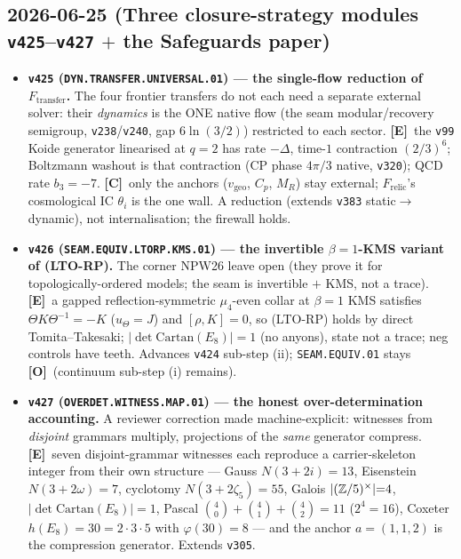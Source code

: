 \documentclass[11pt]{article}
\providecommand{\mE}{\textbf{[E]}}\providecommand{\mC}{\textbf{[C]}}
\providecommand{\mO}{\textbf{[O]}}\providecommand{\mX}{\textbf{[X]}}
\begin{document}
\subsection*{2026-06-25 (Three closure-strategy modules \texttt{v425}--\texttt{v427} $+$ the Safeguards paper)}
\begin{itemize}
\item \textbf{\texttt{v425} (\texttt{DYN.TRANSFER.UNIVERSAL.01}) --- the single-flow reduction of
$F_{\mathrm{transfer}}$.} The four frontier transfers do not each need a separate external solver: their
\emph{dynamics} is the ONE native flow (the seam modular/recovery semigroup, \texttt{v238}/\texttt{v240},
gap $6\ln(3/2)$) restricted to each sector. \mE\ the \texttt{v99} Koide generator linearised at $q{=}2$ has
rate $-\Delta$, time-$1$ contraction $(2/3)^6$; Boltzmann washout is that contraction (CP phase $4\pi/3$
native, \texttt{v320}); QCD rate $b_3{=}-7$. \mC\ only the anchors ($v_{\mathrm{geo}}$, $C_p$, $M_R$) stay
external; $F_{\mathrm{relic}}$'s cosmological IC $\theta_i$ is the one wall. A reduction (extends
\texttt{v383} static$\to$dynamic), not internalisation; the firewall holds.
\item \textbf{\texttt{v426} (\texttt{SEAM.EQUIV.LTORP.KMS.01}) --- the invertible $\beta{=}1$-KMS variant of
(LTO-RP).} The corner NPW26 leave open (they prove it for topologically-ordered models; the seam is
invertible $+$ KMS, not a trace). \mE\ a gapped reflection-symmetric $\mu_4$-even collar at $\beta{=}1$ KMS
satisfies $\Theta K\Theta^{-1}{=}{-}K$ ($u_\Theta{=}J$) and $[\rho,K]{=}0$, so (LTO-RP) holds by direct
Tomita--Takesaki; $|\!\det\mathrm{Cartan}(E_8)|{=}1$ (no anyons), state not a trace; neg controls have
teeth. Advances \texttt{v424} sub-step (ii); \texttt{SEAM.EQUIV.01} stays \mO\ (continuum sub-step (i)
remains).
\item \textbf{\texttt{v427} (\texttt{OVERDET.WITNESS.MAP.01}) --- the honest over-determination accounting.}
A reviewer correction made machine-explicit: witnesses from \emph{disjoint} grammars multiply, projections
of the \emph{same} generator compress. \mE\ seven disjoint-grammar witnesses each reproduce a
carrier-skeleton integer from their own structure --- Gauss $N(3{+}2i){=}13$, Eisenstein $N(3{+}2\omega){=}7$,
cyclotomy $N(3{+}2\zeta_5){=}55$, Galois $|(\mathbb{Z}/5)^\times|{=}4$, $|\!\det\mathrm{Cartan}(E_8)|{=}1$, Pascal
$\binom40{+}\binom41{+}\binom42{=}11$ ($2^4{=}16$), Coxeter $h(E_8){=}30{=}2{\cdot}3{\cdot}5$ with
$\varphi(30){=}8$ --- and the anchor $a{=}(1,1,2)$ is the compression generator. Extends \texttt{v305}.

\end{itemize}
\end{document}
